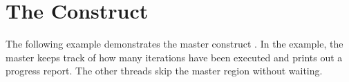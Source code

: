 \pagebreak
\section{The  Construct}
\label{sec:master}

The following example demonstrates the master construct . In the example, the master 
keeps track of how many iterations have been executed and prints out a progress 
report. The other threads skip the master region without waiting.




